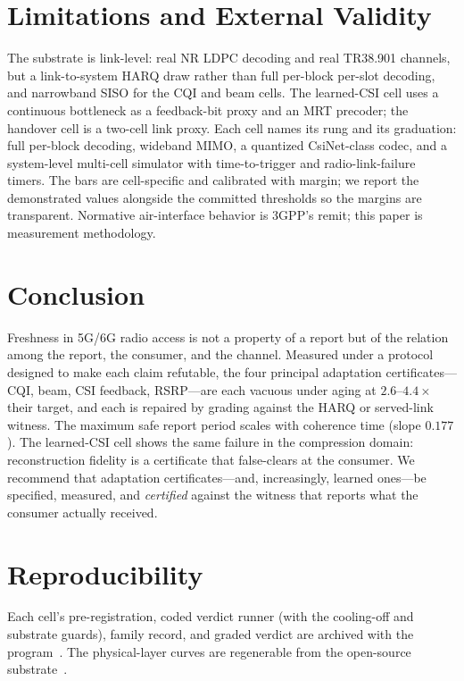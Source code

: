\documentclass[lettersize,onecolumn]{IEEEtran}
\theoremstyle{remark}
\begin{document}
\section{Limitations and External Validity}
The substrate is link-level: real NR LDPC decoding and real TR38.901 channels,
but a link-to-system HARQ draw rather than full per-block per-slot decoding, and
narrowband SISO for the CQI and beam cells. The learned-CSI cell uses a
continuous bottleneck as a feedback-bit proxy and an MRT precoder; the handover
cell is a two-cell link proxy. Each cell names its rung and its graduation:
full per-block decoding, wideband MIMO, a quantized CsiNet-class codec, and a
system-level multi-cell simulator with time-to-trigger and radio-link-failure
timers. The bars are cell-specific and calibrated with margin; we report the
demonstrated values alongside the committed thresholds so the margins are
transparent. Normative air-interface behavior is 3GPP's remit; this paper is
measurement methodology.

\section{Conclusion}
Freshness in 5G/6G radio access is not a property of a report but of the relation
among the report, the consumer, and the channel. Measured under a protocol
designed to make each claim refutable, the four principal adaptation
certificates---CQI, beam, CSI feedback, RSRP---are each vacuous under aging at
$2.6$--$4.4\times$ their target, and each is repaired by grading against the HARQ
or served-link witness. The maximum safe report period scales with coherence
time (slope $0.177$). The learned-CSI cell shows the same failure in the
compression domain: reconstruction fidelity is a certificate that false-clears at
the consumer. We recommend that adaptation certificates---and, increasingly,
learned ones---be specified, measured, and \emph{certified} against the witness
that reports what the consumer actually received.

\section*{Reproducibility}
Each cell's pre-registration, coded verdict runner (with the cooling-off and
substrate guards), family record, and graded verdict are archived with the
program~\cite{bond_prereg}. The physical-layer curves are regenerable from the
open-source substrate~\cite{sionna2022}.



\end{document}
